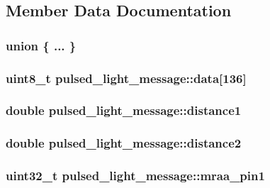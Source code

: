 \subsection{Member Data Documentation}
\hypertarget{structpulsed__light__message_a61949b92c22465fb5342a702d320b357}{\subsubsection[{"@5}]{\setlength{\rightskip}{0pt plus 5cm}union \{ ... \} }}\label{structpulsed__light__message_a61949b92c22465fb5342a702d320b357}
\hypertarget{structpulsed__light__message_a4598eab79d2487a7bdb3d1aa64a10e6f}{
\subsubsection[{data}]{\setlength{\rightskip}{0pt plus 5cm}uint8\-\_\-t pulsed\-\_\-light\-\_\-message\-::data\mbox{[}136\mbox{]}}}\label{structpulsed__light__message_a4598eab79d2487a7bdb3d1aa64a10e6f}
\hypertarget{structpulsed__light__message_a978465139ddc4eaef1cf0bf5c87aa095}{
\subsubsection[{distance1}]{\setlength{\rightskip}{0pt plus 5cm}double pulsed\-\_\-light\-\_\-message\-::distance1}}\label{structpulsed__light__message_a978465139ddc4eaef1cf0bf5c87aa095}
\hypertarget{structpulsed__light__message_a5b2b73eea673eb1ba7c7793bb90d89d6}{
\subsubsection[{distance2}]{\setlength{\rightskip}{0pt plus 5cm}double pulsed\-\_\-light\-\_\-message\-::distance2}}\label{structpulsed__light__message_a5b2b73eea673eb1ba7c7793bb90d89d6}
\hypertarget{structpulsed__light__message_aed1414064822ca15f33ab72b64b98a7d}{
\subsubsection[{mraa\-\_\-pin1}]{\setlength{\rightskip}{0pt plus 5cm}uint32\-\_\-t pulsed\-\_\-light\-\_\-message\-::mraa\-\_\-pin1}}\label{structpulsed__light__message_aed1414064822ca15f33ab72b64b98a7d}
